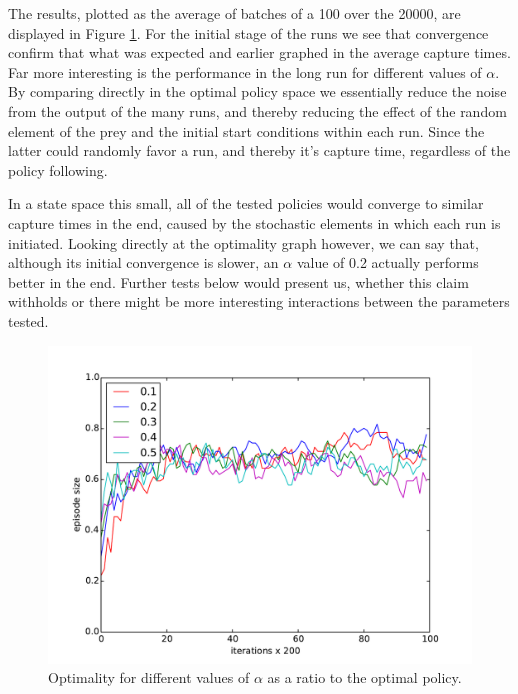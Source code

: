 \documentclass[paper=a4, fontsize=11pt]{scrartcl}
\numberwithin{equation}{section}		%
\numberwithin{figure}{section}			%
\numberwithin{table}{section}				%
\begin{document}
The results, plotted as the average of batches of a 100 over the 20000, are displayed in Figure \ref{figure:alphaOpti}. For the initial stage of the runs we see that convergence confirm that what was expected and earlier graphed in the average capture times. Far more interesting is the performance in the long run for different values of $\alpha$. By comparing directly in the optimal policy space we essentially reduce the noise from the output of the many runs, and thereby reducing the effect of the random element of the prey and the initial start conditions within each run. Since the latter could randomly favor a run, and thereby it's capture time, regardless of the policy following. 

In a state space this small, all of the tested policies would converge to similar capture times in the end, caused by the stochastic elements in which each run is initiated. Looking directly at the optimality graph however, we can say that, although its initial convergence is slower, an $\alpha$ value of 0.2 actually performs better in the end. Further tests below would present us, whether this claim withholds or there might be more interesting interactions between the parameters tested.
\begin{figure}[H] \centering
\includegraphics[scale=0.6]{alphaOptimality.pdf}
\caption{Optimality for different values of $\alpha$ as a ratio to the optimal policy.} 
\label{figure:alphaOpti}
\end{figure}
\end{document}
